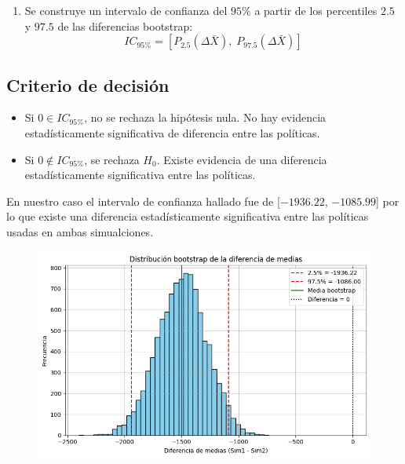 \documentclass{article}
\begin{document}
\begin{itemize}
\begin{enumerate}
    \item Se construye un intervalo de confianza del $95\%$ a partir de los percentiles $2.5$ y $97.5$ de las diferencias bootstrap:
    \[
    IC_{95\%} = \left[P_{2.5}(\Delta \bar{X}),\; P_{97.5}(\Delta \bar{X})\right]
    \]
\end{enumerate}

\subsection*{Criterio de decisión}

\begin{itemize}
    \item Si $0 \in IC_{95\%}$, no se rechaza la hipótesis nula. No hay evidencia estadísticamente significativa de diferencia entre las políticas.
    \item Si $0 \notin IC_{95\%}$, se rechaza $H_0$. Existe evidencia de una diferencia estadísticamente significativa entre las políticas.
\end{itemize}

En nuestro caso el intervalo de confianza hallado fue de [$-1936.22$, $-1085.99$]
por lo que existe una diferencia estadísticamente significativa entre las políticas usadas en ambas simualciones.

\begin{figure}[H]
    \centering
    \includegraphics[width=0.7\linewidth]{./output2.png}
    \label{fig:enter-label}
\end{figure}


\end{itemize}
\end{document}
